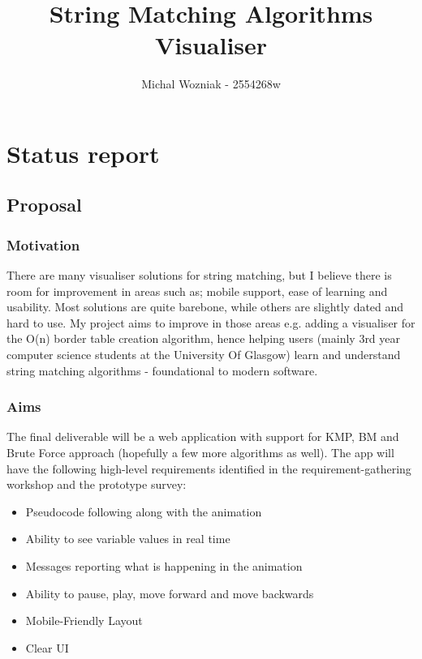\documentclass[11pt]{article}
\title{ String Matching Algorithms Visualiser}
\author{ Michal Wozniak - 2554268w }
\providecommand{\tightlist}{%
  \setlength{\itemsep}{0pt}\setlength{\parskip}{0pt}}
\begin{document}
\maketitle


\section{Status report}

\subsection{Proposal}\label{proposal}

\subsubsection{Motivation}\label{motivation}

There are many visualiser solutions for string matching, but I believe there is room for improvement in areas such as; mobile support, ease of learning and usability. Most solutions are quite barebone, while others are slightly dated and hard to use. My project aims to improve in those areas e.g. adding a visualiser for the O(n) border table creation algorithm, hence helping users (mainly 3rd year computer science students at the University Of Glasgow) learn and understand string matching algorithms - foundational to modern software.

\subsubsection{Aims}\label{aims}

The final deliverable will be a web application with support for KMP, BM and Brute Force approach (hopefully a few more algorithms as well). The app will have the following high-level requirements identified in the requirement-gathering workshop and the prototype survey:
\begin{itemize}
    \tightlist
    \item Pseudocode following along with the animation
    \item Ability to see variable values in real time
    \item Messages reporting what is happening in the animation
    \item Ability to pause, play, move forward and move backwards
    \item Mobile-Friendly Layout
    \item Clear UI
\end{itemize}
\end{document}
